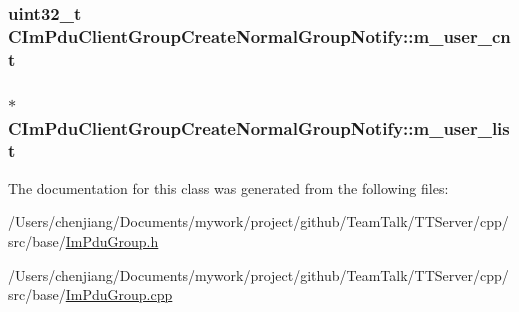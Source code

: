 \subsubsection[{m\+\_\+user\+\_\+cnt}]{\setlength{\rightskip}{0pt plus 5cm}uint32\+\_\+t C\+Im\+Pdu\+Client\+Group\+Create\+Normal\+Group\+Notify\+::m\+\_\+user\+\_\+cnt\hspace{0.3cm}{\ttfamily [private]}}\label{class_c_im_pdu_client_group_create_normal_group_notify_a11bf0d82ce7dcb3e0aea4e635c60bda0}
\hypertarget{class_c_im_pdu_client_group_create_normal_group_notify_ad03dfd85e896e6b96261f3b22a784297}{}
\subsubsection[{m\+\_\+user\+\_\+list}]{$\ast$ C\+Im\+Pdu\+Client\+Group\+Create\+Normal\+Group\+Notify\+::m\+\_\+user\+\_\+list\hspace{0.3cm}{\ttfamily [private]}}\label{class_c_im_pdu_client_group_create_normal_group_notify_ad03dfd85e896e6b96261f3b22a784297}


The documentation for this class was generated from the following files\+:\begin{DoxyCompactItemize}
\item 
/\+Users/chenjiang/\+Documents/mywork/project/github/\+Team\+Talk/\+T\+T\+Server/cpp/src/base/\hyperlink{_im_pdu_group_8h}{Im\+Pdu\+Group.\+h}\item 
/\+Users/chenjiang/\+Documents/mywork/project/github/\+Team\+Talk/\+T\+T\+Server/cpp/src/base/\hyperlink{_im_pdu_group_8cpp}{Im\+Pdu\+Group.\+cpp}\end{DoxyCompactItemize}
